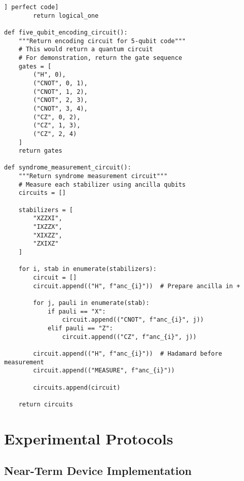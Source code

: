 \documentclass[12pt,a4paper]{article}
\begin{document}
\begin{lstlisting}[style=python,caption=Implementation of the [[5,1,3]] perfect code]
        return logical_one

def five_qubit_encoding_circuit():
    """Return encoding circuit for 5-qubit code"""
    # This would return a quantum circuit
    # For demonstration, return the gate sequence
    gates = [
        ("H", 0),
        ("CNOT", 0, 1),
        ("CNOT", 1, 2), 
        ("CNOT", 2, 3),
        ("CNOT", 3, 4),
        ("CZ", 0, 2),
        ("CZ", 1, 3),
        ("CZ", 2, 4)
    ]
    return gates

def syndrome_measurement_circuit():
    """Return syndrome measurement circuit"""
    # Measure each stabilizer using ancilla qubits
    circuits = []
    
    stabilizers = [
        "XZZXI",
        "IXZZX", 
        "XIXZZ",
        "ZXIXZ"
    ]
    
    for i, stab in enumerate(stabilizers):
        circuit = []
        circuit.append(("H", f"anc_{i}"))  # Prepare ancilla in +
        
        for j, pauli in enumerate(stab):
            if pauli == "X":
                circuit.append(("CNOT", f"anc_{i}", j))
            elif pauli == "Z":
                circuit.append(("CZ", f"anc_{i}", j))
        
        circuit.append(("H", f"anc_{i}"))  # Hadamard before measurement
        circuit.append(("MEASURE", f"anc_{i}"))
        
        circuits.append(circuit)
    
    return circuits
\end{lstlisting}

\section{Experimental Protocols}

\subsection{Near-Term Device Implementation}
\end{document}
